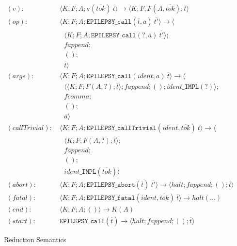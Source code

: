 \documentclass[12pt]{article}
\theoremstyle{break}
\begin{document}
\begin{figure}
    \caption{Reduction Semantics}

    \begin{align*}
        (v): & \ \langle K; F; A; \texttt{v}(\overline{tok}) \ \overline{t} \rangle \to
            \langle K; F; F(A, \overline{tok}); \overline{t} \rangle \\
        (op): & \ \langle K; F; A; \texttt{EPILEPSY\_call}(\overline{t}, \overline{a}) \ \overline{t'} \rangle \to \langle \\
            & \ \ \ \ \langle K; F; A; \texttt{EPILEPSY\_call}(?, \overline{a}) \ \overline{t'} \rangle; \\
            & \ \ \ \ fappend; \\
            & \ \ \ \ (); \\
            & \ \ \ \ \overline{t} \rangle \\
        (args): & \ \langle K; F; A; \texttt{EPILEPSY\_call}(ident, \overline{a}) \ \overline{t} \rangle \to \langle \\
            & \ \ \ \ \langle \langle K; F; F(A, ?); \overline{t} \rangle; fappend; (); ident\texttt{\_IMPL}(?) \rangle; \\
            & \ \ \ \ fcomma; \\
            & \ \ \ \ (); \\
            & \ \ \ \ \overline{a} \rangle \\
        (callTrivial): & \ \langle K; F; A; \texttt{EPILEPSY\_callTrivial}(ident, \overline{tok}) \ \overline{t} \rangle \to \langle \\
            & \ \ \ \ \langle K; F; F(A, ?); \overline{t} \rangle; \\
            & \ \ \ \ fappend; \\
            & \ \ \ \ (); \\
            & \ \ \ \ ident\texttt{\_IMPL}(\overline{tok}) \rangle \\
        (abort): & \ \langle K; F; A; \texttt{EPILEPSY\_abort}(\overline{t}) \ \overline{t'} \rangle \to \langle halt; fappend; (); \overline{t} \rangle \\
        (fatal): & \ \langle K; F; A; \texttt{EPILEPSY\_fatal}(ident, \overline{tok}) \ \overline{t} \rangle \to halt(\ldots) \\
        (end): & \ \langle K; F; A; () \rangle \to K(A) \\
        (start): & \ \texttt{EPILEPSY\_call}(\overline{t}) \to \langle halt; fappend; (); \overline{t} \rangle
    \end{align*}
    \label{ReductionSemantics}
\end{figure}
\end{document}
